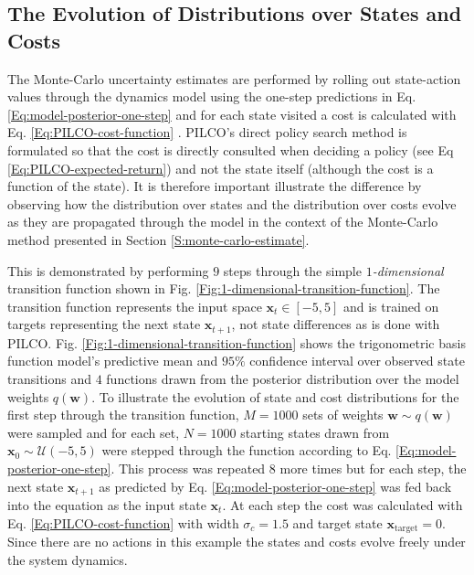\subsection{The Evolution of Distributions over States and Costs}
The Monte-Carlo uncertainty estimates are performed by rolling out state-action values through the dynamics model using the one-step predictions in Eq. \ref{Eq:model-posterior-one-step} and for each state visited a cost is calculated with Eq. \ref{Eq:PILCO-cost-function} . PILCO's direct policy search method is formulated so that the cost is directly consulted when deciding a policy (see Eq \ref{Eq:PILCO-expected-return}) and not the state itself (although the cost is a function of the state). It is therefore important illustrate the difference by observing how the distribution over states and the distribution over costs evolve as they are propagated through the model in the context of the Monte-Carlo method presented in Section \ref{S:monte-carlo-estimate}.

This is demonstrated by performing $9$ steps through the simple $1$\textit{-dimensional} transition function shown in Fig. \ref{Fig:1-dimensional-transition-function}. The transition function represents the input space $\mathbf{x}_{t}\in [-5, 5]$ and is trained on targets representing the next state $\mathbf{x}_{t+1}$, not state differences as is done with PILCO. Fig. \ref{Fig:1-dimensional-transition-function} shows the trigonometric basis function model's predictive mean and $95\%$ confidence interval over observed state transitions and $4$ functions drawn from the posterior distribution over the model weights $q(\mathbf{w})$. To illustrate the evolution of state and cost distributions for the first step through the transition function, $M=1000$ sets of weights $\mathbf{w} \sim q(\mathbf{w})$ were sampled and for each set, $N=1000$ starting states drawn from $\mathbf{x}_{0} \sim \mathcal{U}(-5,5)$ were stepped through the function according to Eq. \ref{Eq:model-posterior-one-step}. This process was repeated $8$ more times but for each step, the next state $\mathbf{x}_{t+1}$ as predicted by Eq. \ref{Eq:model-posterior-one-step} was fed back into the equation as the input state $\mathbf{x}_{t}$. At each step the cost was calculated with Eq. \ref{Eq:PILCO-cost-function} with width $\sigma_{c}=1.5$ and target state $\mathbf{x}_{\text{target}}=0$. Since there are no actions in this example the states and costs evolve freely under the system dynamics.

